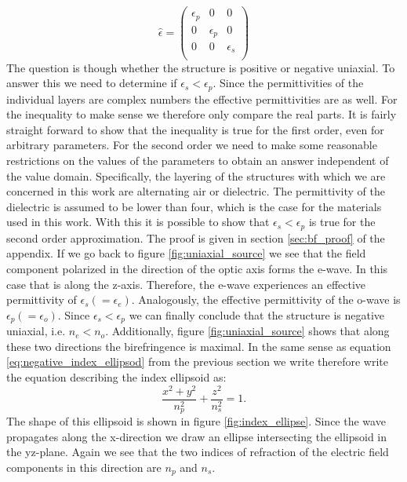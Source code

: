 \begin{equation}
    \label{eq:rytov_tensor}
    \hat{\epsilon} = 
    \begin{pmatrix}
        \epsilon_{p} & 0 & 0 \\
        0 & \epsilon_{p} & 0 \\
        0 & 0 & \epsilon_{s} \\
    \end{pmatrix}
\end{equation}
The question is though whether the structure is positive or negative uniaxial. To answer this we need to determine if $\epsilon_{s} < \epsilon_{p}$. Since the permittivities of the individual layers are complex numbers the effective permittivities are as well. For the inequality to make sense we therefore only compare the real parts. It is fairly straight forward to show that the inequality is true for the first order, even for arbitrary parameters. For the second order we need to make some reasonable restrictions on the values of the parameters to obtain an answer independent of the value domain. Specifically, the layering of the structures with which we are concerned in this work are alternating air or dielectric. The permittivity of the dielectric is assumed to be lower than four, which is the case for the materials used in this work. With this it is possible to show that $\epsilon_{s} < \epsilon_{p}$ is true for the second order approximation. The proof is given in section \ref{sec:bf_proof} of the appendix. If we go back to figure \ref{fig:uniaxial_source} we see that the field component polarized in the direction of the optic axis forms the e-wave. In this case that is along the z-axis. Therefore, the e-wave experiences an effective permittivity of $\epsilon_{s}(=\epsilon_{e})$. Analogously, the effective permittivity of the o-wave is $\epsilon_{p}(=\epsilon_{o})$. Since $\epsilon_{s} < \epsilon_{p}$ we can finally conclude that the structure is negative uniaxial, i.e. $n_e < n_o$. Additionally, figure \ref{fig:uniaxial_source} shows that along these two directions the birefringence is maximal. 
In the same sense as equation \ref{eq:negative_index_ellipsod} from the previous section we write therefore write the equation describing the index ellipsoid as:
\begin{equation}
    \frac{x^2+y^2}{n_p^2}+\frac{z^2}{n_s^2}=1.
\end{equation}
The shape of this ellipsoid is shown in figure \ref{fig:index_ellipse}. Since the wave propagates along the x-direction we draw an ellipse intersecting the ellipsoid in the yz-plane. Again we see that the two indices of refraction of the electric field components in this direction are $n_{p}$ and $n_{s}$. 
